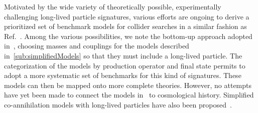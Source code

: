 Motivated by the wide variety of theoretically possible, experimentally challenging long-lived particle signatures, various efforts are ongoing to derive a prioritized set of benchmark models for collider searches in a similar fashion as Ref.~\cite{Abercrombie:2015wmb}. Among the various possibilities, we note the bottom-up approach adopted in~\cite{Buchmueller:2017uqu}, choosing masses and couplings for the models described in~\ref{sub:simplifiedModels} so that they must include a long-lived particle. The categorization of the models by production operator and final state permits to adopt a more systematic set of benchmarks for this kind of signatures. These models can then be mapped onto more complete theories. However, no attempts have yet been made to connect the models in~\cite{Buchmueller:2017uqu} to cosmological history. 
Simplified co-annihilation models with long-lived particles have also been proposed~\cite{ElHedri:2017nny}. 




